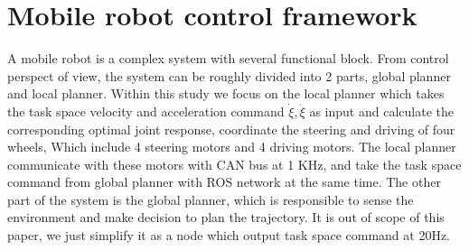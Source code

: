 \chapter{Mobile robot control framework}
\label{cha:framework}
A mobile robot is a complex system with several functional block. From control perspect of view, the system can be roughly divided into 2 parts, global planner and local planner.
Within this study we focus on the local planner which takes the task space velocity and acceleration command $\dot{\xi},\ddot{\xi}$ as input and calculate the corresponding optimal joint response, coordinate the steering and driving of four wheels, Which include 4 steering motors and 4 driving motors. The local planner communicate with these motors with CAN bus at 1 KHz, and take the task space command from global planner with ROS network at the same time.
The other part of the system is the global planner, which is responsible to sense the environment and make decision to plan the trajectory. It is out of scope of this paper, we just simplify it as a node which output task space command at 20Hz.



